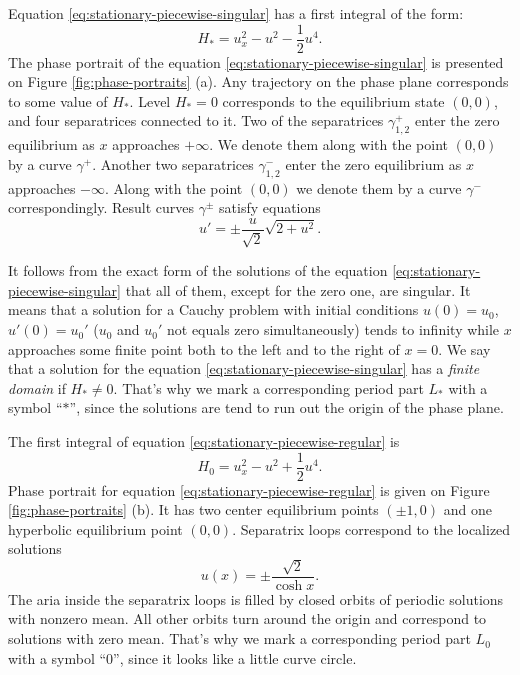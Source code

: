 Equation \eqref{eq:stationary-piecewise-singular} has a first integral of the form:
\begin{equation}
	H_* = u_x^2 - u^2 - \frac{1}{2} u^4.
\label{eq:stationary-piecewise-singular-integral}
\end{equation}
The phase portrait of the equation \eqref{eq:stationary-piecewise-singular} is presented on Figure \ref{fig:phase-portraits} (a).
Any trajectory on the phase plane corresponds to some value of $H_*$.
Level $H_* = 0$ corresponds to the equilibrium state $(0, 0)$, and four separatrices connected to it.
Two of the separatrices $\gamma_{1,2}^+$ enter the zero equilibrium as $x$ approaches $+\infty$.
We denote them along with the point $(0, 0)$ by a curve $\gamma^+$.
Another two separatrices $\gamma_{1,2}^-$ enter the zero equilibrium as $x$ approaches $-\infty$.
Along with the point $(0, 0)$ we denote them by a curve $\gamma^-$ correspondingly.
Result curves $\gamma^{\pm}$ satisfy equations
\begin{equation}
	u' = \pm \frac{u}{\sqrt{2}} \sqrt{2 + u^2}.
\end{equation}

It follows from the exact form of the solutions of the equation \eqref{eq:stationary-piecewise-singular} that all of them, except for the zero one, are singular.
It means that a solution for a Cauchy problem with initial conditions $u(0) = u_0$, $u'(0) = u_0'$ ($u_0$ and $u_0'$ not equals zero simultaneously) tends to infinity while $x$ approaches some finite point both to the left and to the right of $x = 0$.
We say that a solution for the equation \eqref{eq:stationary-piecewise-singular} has a {\it finite domain} if $H_* \neq 0$.
That's why we mark a corresponding period part $L_*$ with a symbol ``$*$'', since the solutions are tend to run out the origin of the phase plane.

The first integral of equation \eqref{eq:stationary-piecewise-regular} is
\begin{equation}
	H_0 = u_x^2 - u^2 + \frac{1}{2} u^4.
\label{eq:stationary-piecewise-regular-integral}
\end{equation}
Phase portrait for equation \eqref{eq:stationary-piecewise-regular} is given on Figure \ref{fig:phase-portraits} (b).
It has two center equilibrium points $(\pm 1, 0)$ and one hyperbolic equilibrium point $(0, 0)$.
Separatrix loops correspond to the localized solutions
\begin{equation}
	u(x) = \pm \frac{\sqrt{2}}{\cosh{x}}.
\end{equation}
The aria inside the separatrix loops is filled by closed orbits of periodic solutions with nonzero mean.
All other orbits turn around the origin and correspond to solutions with zero mean.
That's why we mark a corresponding period part $L_0$ with a symbol ``$0$'', since it looks like a little curve circle.

